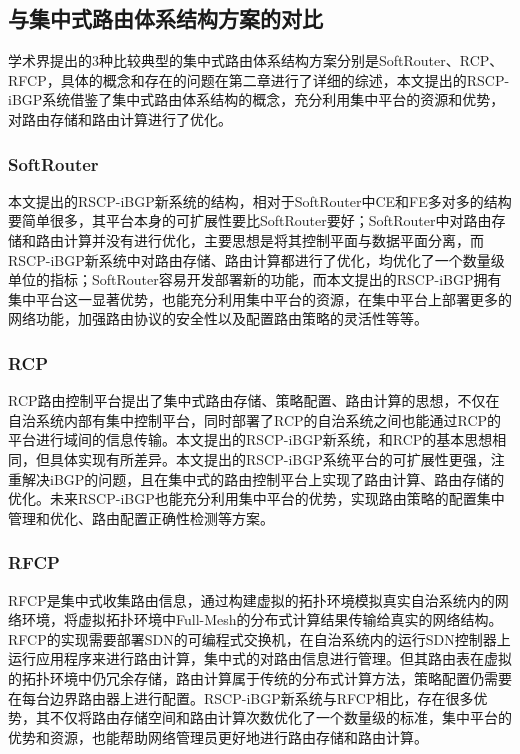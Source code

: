 \subsection{与集中式路由体系结构方案的对比}


学术界提出的3种比较典型的集中式路由体系结构方案分别是SoftRouter、RCP、RFCP，具体的概念和存在的问题在第二章进行了详细的综述，本文提出的RSCP-iBGP系统借鉴了集中式路由体系结构的概念，充分利用集中平台的资源和优势，对路由存储和路由计算进行了优化。

\subsubsection{SoftRouter}

本文提出的RSCP-iBGP新系统的结构，相对于SoftRouter中CE和FE多对多的结构要简单很多，其平台本身的可扩展性要比SoftRouter要好；SoftRouter中对路由存储和路由计算并没有进行优化，主要思想是将其控制平面与数据平面分离，而RSCP-iBGP新系统中对路由存储、路由计算都进行了优化，均优化了一个数量级单位的指标；SoftRouter容易开发部署新的功能，而本文提出的RSCP-iBGP拥有集中平台这一显著优势，也能充分利用集中平台的资源，在集中平台上部署更多的网络功能，加强路由协议的安全性以及配置路由策略的灵活性等等。

\subsubsection{RCP}
RCP路由控制平台提出了集中式路由存储、策略配置、路由计算的思想，不仅在自治系统内部有集中控制平台，同时部署了RCP的自治系统之间也能通过RCP的平台进行域间的信息传输。本文提出的RSCP-iBGP新系统，和RCP的基本思想相同，但具体实现有所差异。本文提出的RSCP-iBGP系统平台的可扩展性更强，注重解决iBGP的问题，且在集中式的路由控制平台上实现了路由计算、路由存储的优化。未来RSCP-iBGP也能充分利用集中平台的优势，实现路由策略的配置集中管理和优化、路由配置正确性检测等方案。


\subsubsection{RFCP}

RFCP是集中式收集路由信息，通过构建虚拟的拓扑环境模拟真实自治系统内的网络环境，将虚拟拓扑环境中Full-Mesh的分布式计算结果传输给真实的网络结构。RFCP的实现需要部署SDN的可编程式交换机，在自治系统内的运行SDN控制器上运行应用程序来进行路由计算，集中式的对路由信息进行管理。但其路由表在虚拟的拓扑环境中仍冗余存储，路由计算属于传统的分布式计算方法，策略配置仍需要在每台边界路由器上进行配置。RSCP-iBGP新系统与RFCP相比，存在很多优势，其不仅将路由存储空间和路由计算次数优化了一个数量级的标准，集中平台的优势和资源，也能帮助网络管理员更好地进行路由存储和路由计算。


